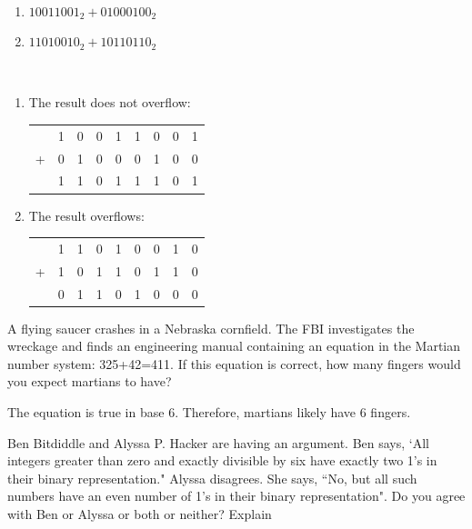 \documentclass[12pt]{article}
\newenvironment{ex}[2][Exercise]{\begin{trivlist}
		\item[\hskip \labelsep {\bfseries #1}\hskip \labelsep {\bfseries #2.}]}{\end{trivlist}}
\newenvironment{sol}[1][Solution]{\begin{trivlist}
		\item[\hskip \labelsep {\bfseries #1:}]}{\end{trivlist}}
\begin{document}
\begin{ex}{1.53}\
	\begin{enumerate}[label=(\alph*)]
		\item $10011001_2+01000100_2$
		\item $11010010_2+10110110_2$
	\end{enumerate}
\end{ex}

\begin{sol}\
	\begin{enumerate}[label=(\alph*)]
		\item The result does not overflow:
		\begin{center}
			\begin{tabular}{c*{8}{@{\,}c}}
				& 1 & 0 & 0 & 1 & 1 & 0 & 0 & 1 \\
		    +   & 0 & 1 & 0 & 0 & 0 & 1 & 0 & 0 \\
				\hline
				& 1 & 1 & 0 & 1 & 1 & 1 & 0 & 1
			\end{tabular}
		\end{center}
		\item The result overflows:
		\begin{center}
			\begin{tabular}{c*{8}{@{\,}c}}
					& 1 & 1 & 0 & 1 & 0 & 0 & 1 & 0 \\
				+   & 1 & 0 & 1 & 1 & 0 & 1 & 1 & 0 \\
				\hline
					& 0 & 1 & 1 & 0 & 1 & 0 & 0 & 0
			\end{tabular}
		\end{center}
	\end{enumerate}
\end{sol}

\begin{ex}{1.66}
	A flying saucer crashes in a Nebraska cornfield. The FBI investigates the wreckage and finds an engineering manual containing an equation in the Martian number system: 325+42=411. If this equation is correct, how many fingers would you expect martians to have?
\end{ex}

\begin{sol}
	The equation is true in base 6. Therefore, martians likely have 6 fingers.
\end{sol}

\begin{ex}{1.67}
	Ben Bitdiddle and Alyssa P. Hacker are having an argument. Ben says, `All integers greater than zero and exactly divisible by six have exactly two 1's in their binary representation." Alyssa disagrees. She says, ``No, but all such numbers have an even number of 1's in their binary representation". Do you agree with Ben or Alyssa or both or neither? Explain
\end{ex}
\end{document}
